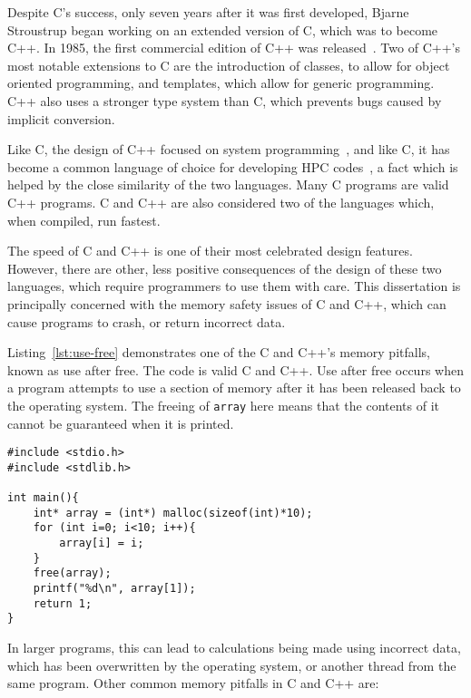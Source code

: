 Despite C's success, only seven years after it was first developed, Bjarne Stroustrup began working on an extended version of C, which was to become C++. In 1985, the first commercial edition of C++ was released~\cite{CPPFAQS}. Two of C++'s most notable extensions to C are the introduction of classes, to allow for object oriented programming, and templates, which allow for generic programming. C++ also uses a stronger type system than C, which prevents bugs caused by implicit conversion.

Like C, the design of C++ focused on system programming~\cite{CplusEssence}, and like C, it has become a common language of choice for developing HPC codes~\cite{foam}, a fact which is helped by the close similarity of the two languages. Many C programs are valid C++ programs. C and C++ are also considered two of the languages which, when compiled, run fastest.

The speed of C and C++ is one of their most celebrated design features. However, there are other, less positive consequences of the design of these two languages, which require programmers to use them with care. This dissertation is principally concerned with the memory safety issues of C and C++, which can cause programs to crash, or return incorrect data.

Listing~\ref{lst:use-free} demonstrates one of the C and C++'s memory pitfalls, known as use after free. The code is valid C and C++. Use after free occurs when a program attempts to use a section of memory after it has been released back to the operating system.
The freeing of \texttt{array} here means that the contents of it cannot be guaranteed when it is printed.

\begin{code}
\begin{verbatim}
#include <stdio.h>
#include <stdlib.h>

int main(){
    int* array = (int*) malloc(sizeof(int)*10);
    for (int i=0; i<10; i++){
        array[i] = i;
    }
    free(array);
    printf("%d\n", array[1]);
    return 1;
}
\end{verbatim}
\label{lst:use-free}
\end{code}

In larger programs, this can lead to calculations being made using incorrect data, which has been overwritten by the operating system, or another thread from the same program. Other common memory pitfalls in C and C++ are:

